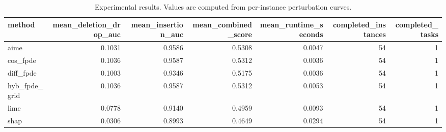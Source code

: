 \begin{table}[t]
\caption{Experimental results. Values are computed from per-instance perturbation curves.}
\label{tab:main_results_computed}
\centering
\begin{tabular}{lrrrrrr}
\toprule
method & mean\_deletion\_drop\_auc & mean\_insertion\_auc & mean\_combined\_score & mean\_runtime\_seconds & completed\_instances & completed\_tasks \\
\midrule
aime & 0.1031 & 0.9586 & 0.5308 & 0.0047 & 54 & 1 \\
cos\_fpde & 0.1036 & 0.9587 & 0.5312 & 0.0036 & 54 & 1 \\
diff\_fpde & 0.1003 & 0.9346 & 0.5175 & 0.0036 & 54 & 1 \\
hyb\_fpde\_grid & 0.1036 & 0.9587 & 0.5312 & 0.0053 & 54 & 1 \\
lime & 0.0778 & 0.9140 & 0.4959 & 0.0093 & 54 & 1 \\
shap & 0.0306 & 0.8993 & 0.4649 & 0.0294 & 54 & 1 \\
\bottomrule
\end{tabular}

\end{table}
